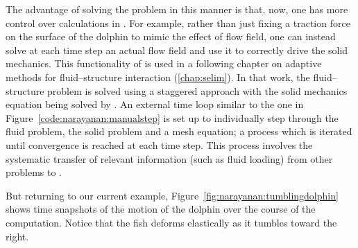 The advantage of solving the problem in this manner is that, now, one
has more control over calculations in \twist{}. For example, rather
than just fixing a traction force on the surface of the dolphin to
mimic the effect of flow field, one can instead solve at each time
step an actual flow field and use it to correctly drive the solid
mechanics. This functionality of \twist{} is used in a following
chapter on adaptive methods for fluid--structure interaction
(\ref{chap:selim}). In that work, the fluid--structure problem is
solved using a staggered approach with the solid mechanics equation
being solved by \twist. An external time loop similar to the one in
Figure~\ref{code:narayanan:manualstep} is set up to individually step
through the fluid problem, the solid problem and a mesh equation; a
process which is iterated until convergence is reached at each time
step. This process involves the systematic transfer of relevant
information (such as fluid loading) from other problems to \twist.

But returning to our current example,
Figure~\ref{fig:narayanan:tumblingdolphin} shows time snapshots of the
motion of the dolphin over the course of the computation. Notice that
the fish deforms elastically as it tumbles toward the right.

